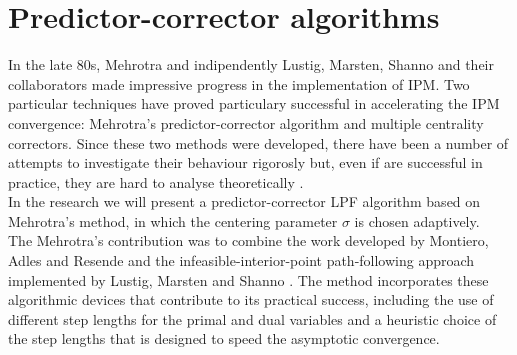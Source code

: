 \documentclass[a4paper,10 pt,titlepage,twoside]{book}
\theoremstyle{plain}
\theoremstyle{definition}
\theoremstyle{remark}
\begin{document}
\section{Predictor-corrector algorithms}\label{sec:pc}
In the late 80s, Mehrotra and indipendently Lustig, Marsten, Shanno and their collaborators made impressive progress in the implementation of IPM. Two particular techniques have proved particulary successful in accelerating the IPM convergence: Mehrotra's predictor-corrector algorithm and multiple centrality correctors. Since these two methods were developed, there have been a number of attempts to investigate their behaviour rigorosly but, even if are successful in practice, they are hard to analyse theoretically \cite{25y}.\\
In the research we will present a predictor-corrector LPF algorithm based on Mehrotra's method, in which the centering parameter $\sigma$ is chosen adaptively.\\
The Mehrotra's contribution was to combine the work developed by Montiero, Adles and Resende \cite{MARE} and the infeasible-interior-point path-following approach implemented by Lustig, Marsten and Shanno \cite{LMS}. 
The method incorporates these algorithmic devices that contribute to its practical success, including the use of different step lengths for the primal and dual variables and a heuristic choice of the step lengths that is designed to speed the asymptotic convergence.\\
\end{document}
